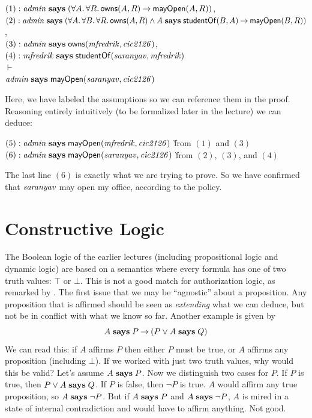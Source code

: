 \documentclass[11pt]{article}
\begin{document}
\begin{tabbing}
  \quad $(1) : \mathit{admin} \mathrel{\mathbf{says}} (\forall A.\, \forall R.\, \mathsf{owns}(A, R) \mathbin{\rightarrow} \mathsf{mayOpen}(A, R))$, \\
  \quad $(2) : \mathit{admin} \mathrel{\mathbf{says}} (\forall A.\, \forall B.\, \forall R.\, \mathsf{owns}(A, R)
  \land A \mathrel{\mathbf{says}} \mathsf{studentOf}(B, A) \mathbin{\rightarrow} \mathsf{mayOpen}(B, R))$, \\[1ex]
  \quad $(3) : \mathit{admin} \mathrel{\mathbf{says}} \mathsf{owns}(\mathit{mfredrik}, \mathit{cic2126})$, \\
  \quad $(4) : \mathit{mfredrik} \mathrel{\mathbf{says}} \mathsf{studentOf}(\mathit{saranyav}, \mathit{mfredrik})$ \\[1ex]
  \quad $\vdash$ \\[1ex]
  \quad $\mathit{admin} \mathrel{\mathbf{says}} \mathsf{mayOpen}(\mathit{saranyav}, \mathit{cic2126})$
\end{tabbing}
Here, we have labeled the assumptions so we can reference them in the
proof.  Reasoning entirely intuitively (to be formalized later in the
lecture) we can deduce:
\begin{tabbing}
  \quad $(5) : \mathit{admin} \mathrel{\mathbf{says}} \mathsf{mayOpen}(\mathit{mfredrik}, \mathit{cic2126})$ \` from $(1)$ and $(3)$ \\
  \quad $(6) : \mathit{admin} \mathrel{\mathbf{says}} \mathsf{mayOpen}(\mathit{saranyav}, \mathit{cic2126})$ \` from $(2)$, $(3)$, and $(4)$
\end{tabbing}
The last line $(6)$ is exactly what we are trying to prove.  So we have
confirmed that $\mathit{saranyav}$ may open my office, according to the policy.

\section{Constructive Logic}

The Boolean logic of the earlier lectures (including propositional logic and
dynamic logic) are based on a semantics where every formula has one of two truth
values: $\top$ or $\bot$.  This is not a good match for authorization logic, as
remarked by \citet{Abadi03lics}.  The first issue that we may be ``agnostic''
about a proposition.  Any proposition that is affirmed should be seen as
\emph{extending} what we can deduce, but not be in conflict with what we know so
far.  Another example is given by
\[
  A \mathrel{\mathbf{says}} P \mathbin{\rightarrow} (P \lor A \mathrel{\mathbf{says}} Q)
\]
We can read this: if $A$ affirms $P$ then either $P$ must be true, or $A$
affirms any proposition (including $\bot$).  If we worked with just two truth
values, why would this be valid?  Let's assume $A \mathrel{\mathbf{says}} P$.  Now we distinguish
two cases for $P$.  If $P$ is true, then $P \lor A \mathrel{\mathbf{says}} Q$.  If $P$ is false,
then $\lnot P$ is true.  $A$ would affirm any true proposition, so
$A \mathrel{\mathbf{says}} \lnot P$.  But if $A \mathrel{\mathbf{says}} P$ and $A \mathrel{\mathbf{says}} \lnot P$, $A$ is mired in a
state of internal contradiction and would have to affirm anything.  Not good.
\end{document}
